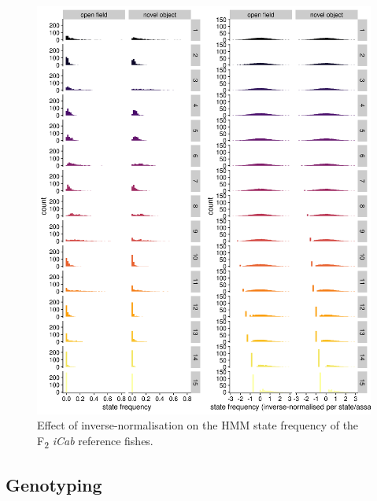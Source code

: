 \documentclass[
]{book}
\begin{document}
\begin{figure}
\includegraphics[width=1\linewidth]{figs/mikk_behaviour/0.08_15_state_freq_F2_sge} \caption{Effect of inverse-normalisation on the HMM state frequency of the F\textsubscript{2} \emph{\textcolor{iCab_424B4D}{iCab}} reference fishes.}\label{fig:F2-state-freq-sge}
\end{figure}

\hypertarget{genotyping}{%
\subsection{Genotyping}\label{genotyping}}
\end{document}
